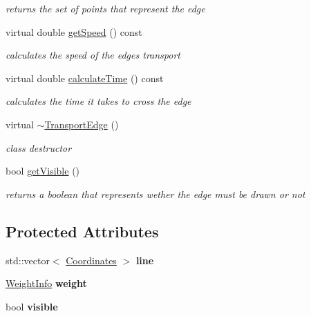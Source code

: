 \begin{DoxyCompactItemize}
\begin{DoxyCompactList}\small\item\em returns the set of points that represent the edge \end{DoxyCompactList}\item 
virtual double \hyperlink{class_transport_edge_a1e85cb198714507e2b1466b86f97b676}{get\+Speed} () const 
\begin{DoxyCompactList}\small\item\em calculates the speed of the edge\textquotesingle{}s transport \end{DoxyCompactList}\item 
virtual double \hyperlink{class_transport_edge_ac9ece7be6c95ec5fa56cae347f2716dd}{calculate\+Time} () const 
\begin{DoxyCompactList}\small\item\em calculates the time it takes to cross the edge \end{DoxyCompactList}\item 
\hypertarget{class_transport_edge_a36780733e6cf6784e895e2562042abee}{}virtual \hyperlink{class_transport_edge_a36780733e6cf6784e895e2562042abee}{$\sim$\+Transport\+Edge} ()\label{class_transport_edge_a36780733e6cf6784e895e2562042abee}

\begin{DoxyCompactList}\small\item\em class destructor \end{DoxyCompactList}\item 
bool \hyperlink{class_transport_edge_ac1513075a93041cea50ea82927760bec}{get\+Visible} ()
\begin{DoxyCompactList}\small\item\em returns a boolean that represents wether the edge must be drawn or not \end{DoxyCompactList}\end{DoxyCompactItemize}
\subsection*{Protected Attributes}
\begin{DoxyCompactItemize}
\item 
\hypertarget{class_transport_edge_a907da2ef63c5d90cfe12a78b21e2292e}{}std\+::vector$<$ \hyperlink{class_coordinates}{Coordinates} $>$ {\bfseries line}\label{class_transport_edge_a907da2ef63c5d90cfe12a78b21e2292e}

\item 
\hypertarget{class_transport_edge_aac54ca3f2f4fc0248dc20efd93806f0c}{}\hyperlink{class_weight_info}{Weight\+Info} {\bfseries weight}\label{class_transport_edge_aac54ca3f2f4fc0248dc20efd93806f0c}

\item 
\hypertarget{class_transport_edge_a3f7f7bfb6bdcbca7ce1d58e5fe102e86}{}bool {\bfseries visible}\label{class_transport_edge_a3f7f7bfb6bdcbca7ce1d58e5fe102e86}

\end{DoxyCompactItemize}


